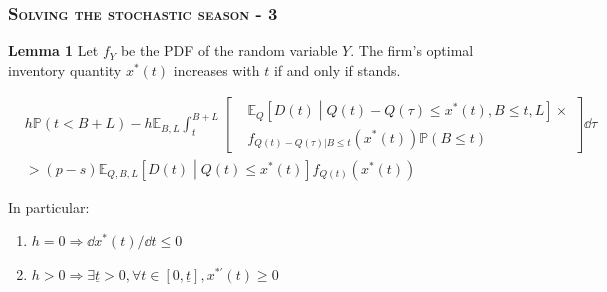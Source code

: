 \documentclass[aspectratio=169]{../presentation}
\begin{document}
    \begin{frame}
        \frametitle{\textsc{Solving the stochastic season - 3}}

        \textrm{\bfseries Lemma 1} Let $f_Y$ be the PDF of the random variable $Y$. The firm's optimal inventory quantity $x^*(t)$ increases with $t$ if and only if  stands.

        \begin{equation}
            \begin{aligned}
                & h\mathbb P(t < B+L) - h\mathbb E_{B, L}\int_t^{B+L}\left[\begin{aligned}
                    & \mathbb E_Q\left[D(t)\middle|Q(t) - Q(\tau) \leq x^*(t), B\leq t, L\right] \times \\
                    & f_{Q(t)-Q(\tau)|B\leq t}\left(x^*(t)\right)\mathbb P(B\leq t)
                \end{aligned}\right]\dd \tau \\
                &> (p-s)\mathbb{E}_{Q, B, L}\left[D(t)\middle| Q(t)\leq x^*(t)\right]f_{Q(t)}\left(x^*(t)\right)
            \end{aligned}
            \label{eq:4}
        \end{equation}

        \pause

        In particular:

        \begin{enumerate}
            \item $h = 0\Rightarrow \dd x^*(t) / \dd t \leq 0$
            \item $h > 0\Rightarrow \exists \underline{t} > 0, \forall t\in [0, \underline t], x^{*\prime}(t) \geq 0$
        \end{enumerate}
    \end{frame}
\end{document}
